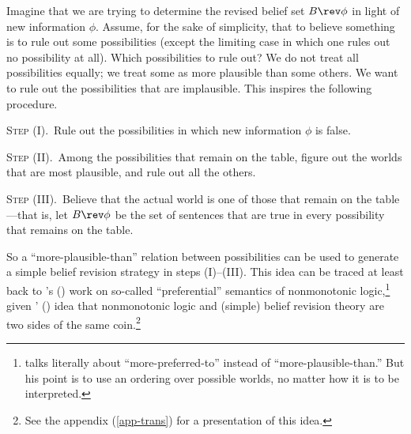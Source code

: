 Imagine that we are trying to determine the revised belief set $B \rev \phi$ in light of new information $\phi$. Assume, for the sake of simplicity, that to believe something is to rule out some possibilities (except the limiting case in which one rules out no possibility at all). Which possibilities to rule out? We do not treat all possibilities equally; we treat some as more plausible than some others. We want to rule out the possibilities that are implausible. This inspires the following procedure. \op

	\xm \textsc{Step (I).}\, Rule out the possibilities in which new information $\phi$ is false.
	
	\xm \textsc{Step (II).}\, Among the possibilities that remain on the table, figure out the worlds that are most plausible, and rule out all the others.
	
	\xm \textsc{Step (III).}\, Believe that the actual world is one of those that remain on the table---that is, let $B \rev \phi$ be the set of sentences that are true in every possibility that remains on the table. 

\ed So a ``more-plausible-than'' relation between possibilities can be used to generate a simple belief revision strategy in steps (I)--(III). This idea can be traced at least back to \citeauthor{shoham1987semantical}'s () work on so-called ``preferential'' semantics of nonmonotonic logic,\footnote
	{\citet{shoham1987semantical} talks literally about ``more-preferred-to'' instead of ``more-plausible-than.'' But his point is to use an ordering over possible worlds, no matter how it is to be interpreted.} 
given \citeauthor{makinson1991relations}' () idea that nonmonotonic logic and (simple) belief revision theory are two sides of the same coin.\footnote
{See the appendix (\autoref{app-trans}) for a presentation of this idea.}

